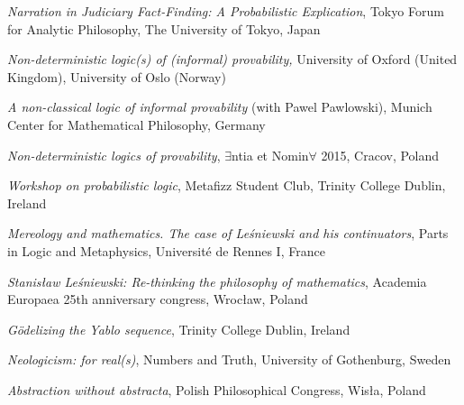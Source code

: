 \documentclass[10pt, a4paper]{article}
\newcommand{\years}[1]{\marginnote{\normalsize #1}}
\begin{document}
\vspace{0.5mm}


\emph{Narration in Judiciary Fact-Finding: A Probabilistic Explication}, Tokyo Forum for Analytic Philosophy, The University of Tokyo, Japan


\vspace{0.5mm}


\years{2015}  \emph{Non-deterministic logic(s) of (informal) provability,}  University of Oxford (United Kingdom), University of Oslo (Norway)


\vspace{0.5mm}


 \emph{A non-classical logic of informal provability} (with Pawel Pawlowski), Munich Center for Mathematical Philosophy, Germany


\vspace{0.5mm}


\emph{Non-deterministic logics of provability}, $\exists$ntia et Nomin$\forall$ 2015, Cracov, Poland


\vspace{0.5mm}


  \emph{Workshop on  probabilistic logic}, Metafizz Student Club, 
Trinity College Dublin, Ireland


\vspace{0.5mm}



\years{2013} \emph{Mereology and mathematics. The case of Le\'sniewski and his continuators}, Parts in Logic and Metaphysics, Universit{\'e} de Rennes I, France


\vspace{0.5mm}


\emph{Stanis\l aw Le\' sniewski: Re-thinking the philosophy of mathematics}, Academia Europaea 25th anniversary congress, Wroc\l aw, Poland


\vspace{0.5mm}




\years{2012} \emph{G{\"o}delizing the Yablo sequence},  Trinity College Dublin, Ireland


\vspace{0.5mm}



\emph{Neologicism: for real(s)}, Numbers and Truth, University of Gothenburg, Sweden



\vspace{0.5mm}

 \emph{Abstraction without abstracta}, Polish Philosophical Congress, Wis{\l}a, Poland
\end{document}
